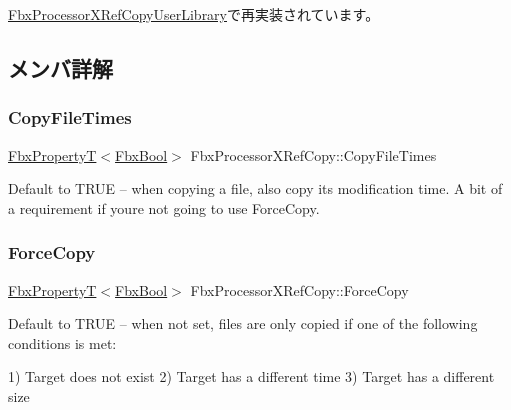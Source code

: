 \hyperlink{class_fbx_processor_x_ref_copy_user_library_a65545232dad661700a6c43e90530b3a6}{Fbx\+Processor\+X\+Ref\+Copy\+User\+Library}で再実装されています。



\subsection{メンバ詳解}
\mbox{\label{class_fbx_processor_x_ref_copy_af289c6fcb05767b0ef362376790efee7}} 
\subsubsection{\texorpdfstring{Copy\+File\+Times}{CopyFileTimes}}
{\footnotesize\ttfamily \hyperlink{class_fbx_property_t}{Fbx\+PropertyT}$<$\hyperlink{fbxtypes_8h_a92e0562b2fe33e76a242f498b362262e}{Fbx\+Bool}$>$ Fbx\+Processor\+X\+Ref\+Copy\+::\+Copy\+File\+Times}

Default to T\+R\+UE -- when copying a file, also copy its modification time. A bit of a requirement if you\textquotesingle{}re not going to use Force\+Copy. \mbox{\label{class_fbx_processor_x_ref_copy_ad0ab8028a48ec1f2062a75aab8f1b023}} 
\subsubsection{\texorpdfstring{Force\+Copy}{ForceCopy}}
{\footnotesize\ttfamily \hyperlink{class_fbx_property_t}{Fbx\+PropertyT}$<$\hyperlink{fbxtypes_8h_a92e0562b2fe33e76a242f498b362262e}{Fbx\+Bool}$>$ Fbx\+Processor\+X\+Ref\+Copy\+::\+Force\+Copy}

Default to T\+R\+UE -- when not set, files are only copied if one of the following conditions is met\+:

1) Target does not exist 2) Target has a different time 3) Target has a different size \mbox{\label{class_fbx_processor_x_ref_copy_a13a7ad375e5d3abb72b393d005edd75e}} 

